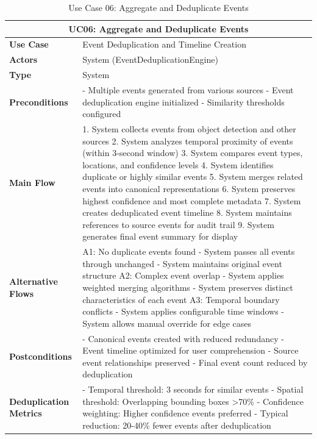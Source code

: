 \documentclass{article}
\begin{document}
\begin{table}[H]
\centering
\begin{tabularx}{\textwidth}{|l|X|}
\hline
\multicolumn{2}{|c|}{\textbf{UC06: Aggregate and Deduplicate Events}} \\ \hline
\textbf{Use Case} & Event Deduplication and Timeline Creation \\ \hline
\textbf{Actors} & System (EventDeduplicationEngine) \\ \hline
\textbf{Type} & System \\ \hline
\textbf{Preconditions} & 
- Multiple events generated from various sources
- Event deduplication engine initialized
- Similarity thresholds configured \\ \hline
\textbf{Main Flow} & 
1. System collects events from object detection and other sources
2. System analyzes temporal proximity of events (within 3-second window)
3. System compares event types, locations, and confidence levels
4. System identifies duplicate or highly similar events
5. System merges related events into canonical representations
6. System preserves highest confidence and most complete metadata
7. System creates deduplicated event timeline
8. System maintains references to source events for audit trail
9. System generates final event summary for display \\ \hline
\textbf{Alternative Flows} & 
A1: No duplicate events found
- System passes all events through unchanged
- System maintains original event structure
A2: Complex event overlap
- System applies weighted merging algorithms
- System preserves distinct characteristics of each event
A3: Temporal boundary conflicts
- System applies configurable time windows
- System allows manual override for edge cases \\ \hline
\textbf{Postconditions} & 
- Canonical events created with reduced redundancy
- Event timeline optimized for user comprehension
- Source event relationships preserved
- Final event count reduced by deduplication \\ \hline
\textbf{Deduplication Metrics} & 
- Temporal threshold: 3 seconds for similar events
- Spatial threshold: Overlapping bounding boxes >70\%
- Confidence weighting: Higher confidence events preferred
- Typical reduction: 20-40\% fewer events after deduplication \\ \hline
\end{tabularx}
\caption{Use Case 06: Aggregate and Deduplicate Events}
\end{table}
\end{document}
